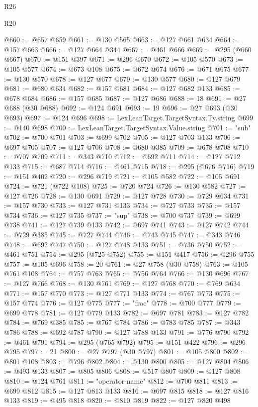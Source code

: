 \begin{lexlean}{R26}
\begin{lexlean}{R20}
\begin{coremodule}
{{{{{{{{{{{{{{{{{{{{{{{{{{{{{{{{{{{{{{{{{{{{{{{{{{{{{{{{{{{{{{{@660 := @657 @659
@661 := @130 @565
@663 := @127 @661 @634
@664 := @157 @663
@666 := @127 @664 @344
@667 := @461 @666
@669 := @295 (@660 @667)
@670 := @151 @397
@671 := @296 @670
@672 := @105 @570
@673 := @105 @577
@674 := @673 @108
@675 := @672 @674
@676 := @671 @675
@677 := @130 @570
@678 := @127 @677
@679 := @130 @577
@680 := @127 @679
@681 := @680 @634
@682 := @157 @681
@684 := @127 @682 @133
@685 := @678 @684
@686 := @157 @685
@687 := @127 @686
@688 := 18
@691 := @27 @688 (@30 @688)
@692 := @124 @691
@693 := 19
@696 := @27 @693 (@30 @693)
@697 := @124 @696
@698 := LexLeanTarget.TargetSyntax.Ty.string
@699 := @140 @698
@700 := LexLeanTarget.TargetSyntax.Value.string
@701 := "sub"
@702 := @700 @701
@703 := @699 @702
@705 := @127 @703 @133
@706 := @697 @705
@707 := @127 @706
@708 := @680 @385
@709 := @678 @708
@710 := @707 @709
@711 := @343 @710
@712 := @692 @711
@714 := @127 @712 @133
@715 := @687 @714
@716 := @461 @715
@718 := @295 (@676 @716)
@719 := @151 @402
@720 := @296 @719
@721 := @105 @582
@722 := @105 @691
@724 := @721 (@722 @108)
@725 := @720 @724
@726 := @130 @582
@727 := @127 @726
@728 := @130 @691
@729 := @127 @728
@730 := @729 @634
@731 := @157 @730
@733 := @127 @731 @133
@734 := @727 @733
@735 := @157 @734
@736 := @127 @735
@737 := "sup"
@738 := @700 @737
@739 := @699 @738
@741 := @127 @739 @133
@742 := @697 @741
@743 := @127 @742
@744 := @729 @385
@745 := @727 @744
@746 := @743 @745
@747 := @343 @746
@748 := @692 @747
@750 := @127 @748 @133
@751 := @736 @750
@752 := @461 @751
@754 := @295 (@725 @752)
@755 := @151 @417
@756 := @296 @755
@757 := @105 @696
@758 := 20
@761 := @27 @758 (@30 @758)
@763 := @105 @761 @108
@764 := @757 @763
@765 := @756 @764
@766 := @130 @696
@767 := @127 @766
@768 := @130 @761
@769 := @127 @768
@770 := @769 @634
@771 := @157 @770
@773 := @127 @771 @133
@774 := @767 @773
@775 := @157 @774
@776 := @127 @775
@777 := "frac"
@778 := @700 @777
@779 := @699 @778
@781 := @127 @779 @133
@782 := @697 @781
@783 := @127 @782
@784 := @769 @385
@785 := @767 @784
@786 := @783 @785
@787 := @343 @786
@788 := @692 @787
@790 := @127 @788 @133
@791 := @776 @790
@792 := @461 @791
@794 := @295 (@765 @792)
@795 := @151 @422
@796 := @296 @795
@797 := 21
@800 := @27 @797 (@30 @797)
@801 := @105 @800
@802 := @801 @108
@803 := @796 @802
@804 := @130 @800
@805 := @127 @804
@806 := @493 @133
@807 := @805 @806
@808 := @517 @807
@809 := @127 @808
@810 := @124 @761
@811 := "operator-name"
@812 := @700 @811
@813 := @699 @812
@815 := @127 @813 @133
@816 := @697 @815
@818 := @127 @816 @133
@819 := @495 @818
@820 := @810 @819
@822 := @127 @820 @498
}}}}}}}}}}}}}}}}}}}}}}}}}}}}}}}}}}}}}}}}}}}}}}}}}}}}}}}}}}}}}}}
\end{coremodule}
\end{lexlean}
\end{lexlean}
